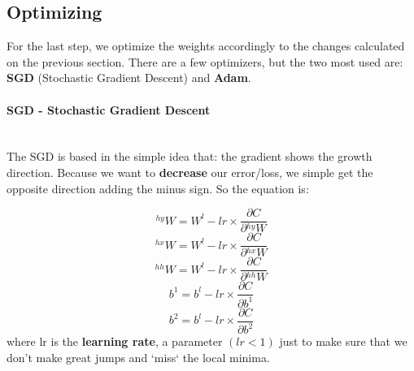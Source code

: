 \documentclass[12pt]{article}
\begin{document}
\subsection{Optimizing}
For the last step, we optimize the weights accordingly to the changes calculated on the previous section. There are a few optimizers, but the two most used are: \textbf{SGD} (Stochastic Gradient Descent) and \textbf{Adam}.   \mbox{} \\

\paragraph{SGD - Stochastic Gradient Descent} \mbox{} \\
The SGD is based in the simple idea that: the gradient shows the growth direction. Because we want to \textbf{decrease} our error/loss, we simple get the opposite direction adding the minus sign. So the equation is:

\begin{equation}
    {}^{hy}W = W^{l} - lr \times \dfrac{\partial C}{\partial {}^{hy}W}
\end{equation}
\begin{equation}
    {}^{hx}W = W^{l} - lr \times \dfrac{\partial C}{\partial {}^{hx}W}
\end{equation}
\begin{equation}
    {}^{hh}W = W^{l} - lr \times \dfrac{\partial C}{\partial {}^{hh}W}
\end{equation}
\begin{equation}
    b^{1} = b^{l} - lr \times \dfrac{\partial C}{\partial b^{1}}
\end{equation}
\begin{equation}
    b^{2} = b^{l} - lr \times \dfrac{\partial C}{\partial b^{2}}
\end{equation}
where lr is the \textbf{learning rate}, a parameter $( lr < 1 )$ just to make sure that we don't make great jumps and `miss` the local minima.
\end{document}
